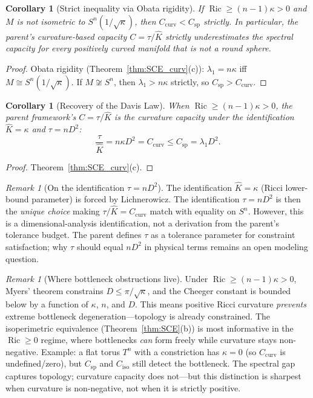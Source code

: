 \documentclass[11pt]{article}
\newtheorem{corollary}[theorem]{Corollary}
\theoremstyle{definition}
\theoremstyle{remark}
\newtheorem{remark}[theorem]{Remark}
\newcommand{\Ric}{\operatorname{Ric}}
\newcommand{\Csp}{C_{\mathrm{sp}}}
\begin{document}
\begin{corollary}[Strict inequality via Obata rigidity]\label{cor:strict}
If $\Ric \ge (n-1)\kappa > 0$ and $M$ is \emph{not} isometric to $S^n(1/\sqrt{\kappa})$, then $C_{\mathrm{curv}} < \Csp$ strictly. In particular, the parent's curvature-based capacity $C = \tau/\hat{K}$ strictly underestimates the spectral capacity for every positively curved manifold that is not a round sphere.
\end{corollary}

\begin{proof}
Obata rigidity (Theorem~\ref{thm:SCE_curv}(c)): $\lambda_1 = n\kappa$ iff $M \cong S^n(1/\sqrt{\kappa})$. If $M \not\cong S^n$, then $\lambda_1 > n\kappa$ strictly, so $\Csp > C_{\mathrm{curv}}$.
\end{proof}

\begin{corollary}[Recovery of the Davis Law]\label{cor:davis_recovery}
When $\Ric \ge (n-1)\kappa > 0$, the parent framework's $C = \tau/\hat{K}$ is the curvature capacity under the identification $\hat{K} = \kappa$ and $\tau = n D^2$:
\[
\frac{\tau}{\hat{K}} = n\kappa D^2 = C_{\mathrm{curv}} \le \Csp = \lambda_1 D^2.
\]
\end{corollary}

\begin{proof}
Theorem~\ref{thm:SCE_curv}(c).
\end{proof}

\begin{remark}[On the identification $\tau = nD^2$]\label{rem:tau}
The identification $\hat{K} = \kappa$ (Ricci lower-bound parameter) is forced by Lichnerowicz. The identification $\tau = nD^2$ is then the \emph{unique choice} making $\tau/\hat{K} = C_{\mathrm{curv}}$ match with equality on $S^n$. However, this is a dimensional-analysis identification, not a derivation from the parent's tolerance budget. The parent defines $\tau$ as a tolerance parameter for constraint satisfaction; why $\tau$ should equal $nD^2$ in physical terms remains an open modeling question.
\end{remark}

\begin{remark}[Where bottleneck obstructions live]\label{rem:bottleneck}
Under $\Ric \ge (n-1)\kappa > 0$, Myers' theorem constrains $D \le \pi/\sqrt{\kappa}$, and the Cheeger constant is bounded below by a function of $\kappa$, $n$, and $D$. This means positive Ricci curvature \emph{prevents} extreme bottleneck degeneration---topology is already constrained. The isoperimetric equivalence (Theorem~\ref{thm:SCE}(b)) is most informative in the $\Ric \ge 0$ regime, where bottlenecks \emph{can} form freely while curvature stays non-negative. Example: a flat torus $T^n$ with a constriction has $\kappa = 0$ (so $C_{\mathrm{curv}}$ is undefined/zero), but $\Csp$ and $C_{\mathrm{iso}}$ still detect the bottleneck. The spectral gap captures topology; curvature capacity does not---but this distinction is sharpest when curvature is non-negative, not when it is strictly positive.
\end{remark}
\end{document}
